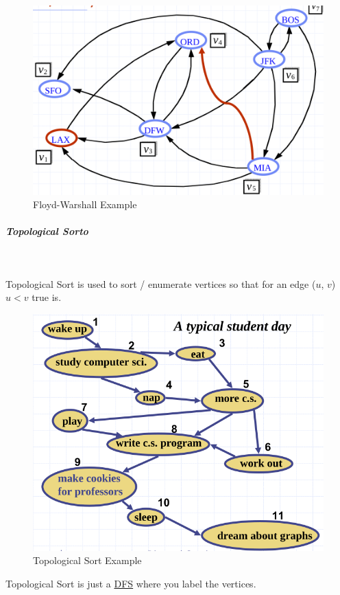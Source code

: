 \documentclass[11pt,twoside,twocolumn,landscape]{article}
\begin{document}
\begin{figure}[htbp]
\centering
\includegraphics[width=.9\linewidth]{img/floyd_warshall.png}
\caption{\label{fig:org3e08aa3}Floyd-Warshall Example}
\end{figure}

\subparagraph{Topological Sorto} \
\label{sec:org1a36908}

Topological Sort is used to sort / enumerate vertices so that for an edge (\(u\), \(v\)) \(u < v\) true is.


\begin{figure}[htbp]
\centering
\includegraphics[width=.9\linewidth]{img/topological_sort_example.png}
\caption{\label{fig:orgfaf1269}Topological Sort Example}
\end{figure}


Topological Sort is just a \href{../../../roam/20220202095038-dfs.org}{DFS} where you label the vertices.
\end{document}
